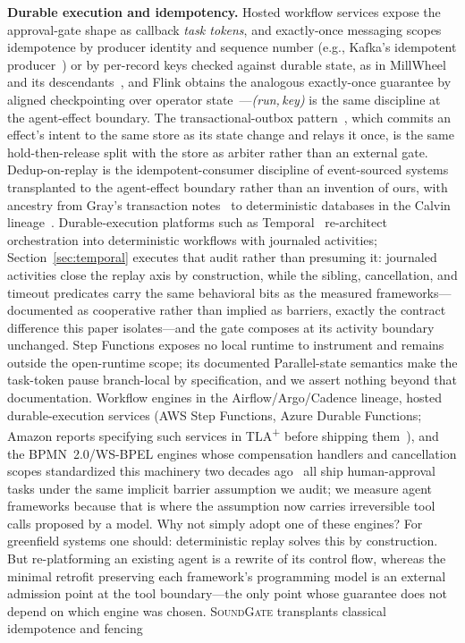 \documentclass[10pt,journal,compsoc]{IEEEtran}
\newcommand{\sys}{\textsc{SoundGate}}
\begin{document}
\textbf{Durable execution and idempotency.} Hosted workflow services expose
the approval-gate shape as callback \emph{task tokens}, and exactly-once
messaging scopes idempotence by producer identity and sequence number (e.g.,
Kafka's idempotent producer~\cite{kafka-kip98}) or by per-record keys checked against durable
state, as in MillWheel and its descendants~\cite{millwheel13}, and Flink
obtains the analogous exactly-once guarantee by aligned checkpointing over
operator state~\cite{flink17}---\emph{(run,\,key)} is the same discipline at
the agent-effect boundary. The transactional-outbox pattern~\cite{outbox},
which commits an effect's intent to the same store as its state change and
relays it once, is the same hold-then-release split with the store as
arbiter rather than an external gate. Dedup-on-replay is the idempotent-consumer discipline of event-sourced systems~\cite{eventsourcing,helland12} transplanted to the agent-effect boundary rather than an invention of ours, with ancestry from Gray's transaction notes~\cite{gray78} to deterministic databases in the Calvin lineage~\cite{calvin12}.
Durable-execution platforms such as Temporal~\cite{temporal} re-architect orchestration into deterministic workflows with journaled activities; Section~\ref{sec:temporal} executes that audit rather than presuming it: journaled activities close the replay axis by construction, while the sibling, cancellation, and timeout predicates carry the same behavioral bits as the measured frameworks---documented as cooperative rather than implied as barriers, exactly the contract difference this paper isolates---and the gate composes at its activity boundary unchanged. Step Functions exposes no local runtime to instrument and remains
outside the open-runtime scope; its documented Parallel-state semantics make
the task-token pause branch-local by specification, and we assert nothing
beyond that documentation. 
Workflow engines in the Airflow/Argo/Cadence lineage, hosted durable-execution services (AWS Step Functions, Azure Durable Functions; Amazon reports specifying such services in TLA\textsuperscript{+} before shipping them~\cite{newcombe15}), and the BPMN~2.0/WS-BPEL engines whose compensation handlers and cancellation scopes standardized this machinery two decades ago~\cite{bpel07} all ship human-approval tasks under the same implicit barrier assumption we audit; we measure agent frameworks because that is where the assumption now carries irreversible tool calls proposed by a model. Why not simply adopt one of these engines? For greenfield systems one should: deterministic replay solves this by construction. But re-platforming an existing agent is a rewrite of its control flow, whereas the minimal retrofit preserving each framework's programming model is an external admission point at the tool boundary---the only point whose guarantee does not depend on which engine was chosen. \sys{} transplants classical idempotence and fencing
\end{document}
